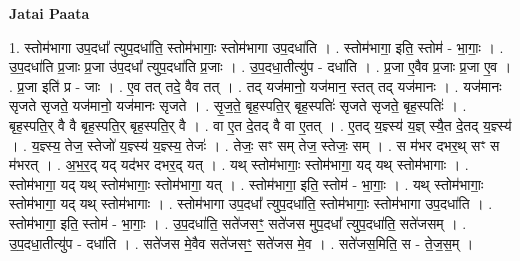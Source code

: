 \documentclass[17pt]{extarticle}
\begin{document}
\textbf{Jatai Paata} \newline

1. स्तोम॑भागा उप॒दधा᳚ त्युप॒दधा॑ति॒ स्तोम॑भागाः॒ स्तोम॑भागा उप॒दधा॑ति । . स्तोम॑भागा॒ इति॒ स्तोम॑ - भा॒गाः॒ । . उ॒प॒दधा॑ति प्र॒जाः प्र॒जा उ॑प॒दधा᳚ त्युप॒दधा॑ति प्र॒जाः । . उ॒प॒दधा॒तीत्यु॑प - दधा॑ति । . प्र॒जा ए॒वैव प्र॒जाः प्र॒जा ए॒व । . प्र॒जा इति॑ प्र - जाः । . ए॒व तत् तदे॒ वैव तत् । . तद् यज॑मानो॒ यज॑मान॒ स्तत् तद् यज॑मानः । . यज॑मानः सृजते सृजते॒ यज॑मानो॒ यज॑मानः सृजते । . सृ॒ज॒ते॒ बृह॒स्पति॒र् बृह॒स्पतिः॑ सृजते सृजते॒ बृह॒स्पतिः॑ । . बृह॒स्पति॒र् वै वै बृह॒स्पति॒र् बृह॒स्पति॒र् वै । . वा ए॒त दे॒तद् वै वा ए॒तत् । . ए॒तद् य॒ज्ञ्स्य॑ य॒ज्ञ् स्यै॒त दे॒तद् य॒ज्ञ्स्य॑ । . य॒ज्ञ्स्य॒ तेज॒ स्तेजो॑ य॒ज्ञ्स्य॑ य॒ज्ञ्स्य॒ तेजः॑ । . तेजः॒ सꣳ सम् तेज॒ स्तेजः॒ सम् । . स म॑भर दभर॒थ् सꣳ स म॑भरत् । . अ॒भ॒र॒द् यद् यद॑भर दभर॒द् यत् । . यथ् स्तोम॑भागाः॒ स्तोम॑भागा॒ यद् यथ् स्तोम॑भागाः । . स्तोम॑भागा॒ यद् यथ् स्तोम॑भागाः॒ स्तोम॑भागा॒ यत् । . स्तोम॑भागा॒ इति॒ स्तोम॑ - भा॒गाः॒ । . यथ् स्तोम॑भागाः॒ स्तोम॑भागा॒ यद् यथ् स्तोम॑भागाः । . स्तोम॑भागा उप॒दधा᳚ त्युप॒दधा॑ति॒ स्तोम॑भागाः॒ स्तोम॑भागा उप॒दधा॑ति । . स्तोम॑भागा॒ इति॒ स्तोम॑ - भा॒गाः॒ । . उ॒प॒दधा॑ति॒ सते॑जसꣳ॒॒ सते॑जस मुप॒दधा᳚ त्युप॒दधा॑ति॒ सते॑जसम् । . उ॒प॒दधा॒तीत्यु॑प - दधा॑ति । . सते॑जस मे॒वैव सते॑जसꣳ॒॒ सते॑जस मे॒व । . सते॑जस॒मिति॒ स - ते॒ज॒स॒म् । \newline
\end{document}
